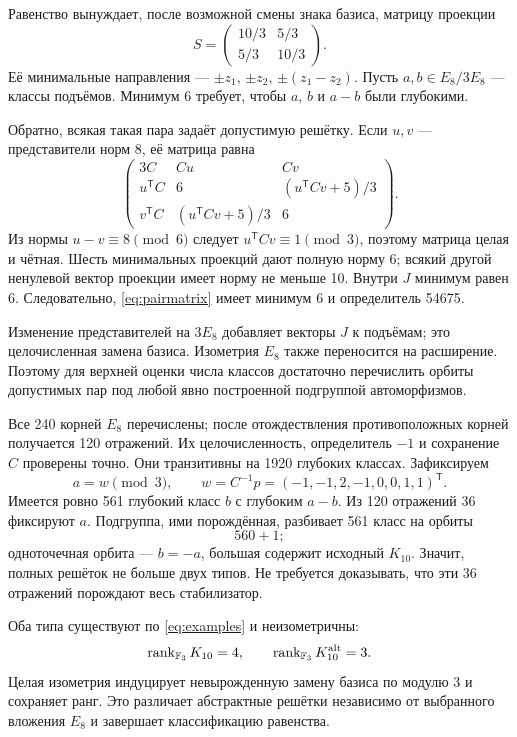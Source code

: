 \documentclass[11pt,a4paper]{article}
\theoremstyle{remark}\newtheorem{remark}[theorem]{Замечание}
\newcommand{\Kalt}{K_{10}^{\mathrm{alt}}}
\begin{document}
Равенство вынуждает, после возможной смены знака базиса, матрицу проекции
\begin{equation}\label{eq:binaryprojection}
S=\begin{pmatrix}10/3&5/3\\5/3&10/3\end{pmatrix}.
\end{equation}
Её минимальные направления --- $\pm z_1$, $\pm z_2$, $\pm(z_1-z_2)$. Пусть $a,b\in E_8/3E_8$ --- классы подъёмов. Минимум 6 требует, чтобы $a$, $b$ и $a-b$ были глубокими.

Обратно, всякая такая пара задаёт допустимую решётку. Если $u,v$ --- представители норм 8, её матрица равна
\begin{equation}\label{eq:pairmatrix}
\begin{pmatrix}
3C&Cu&Cv\\
u^{\mathsf T}C&6&(u^{\mathsf T}Cv+5)/3\\
v^{\mathsf T}C&(u^{\mathsf T}Cv+5)/3&6
\end{pmatrix}.
\end{equation}
Из нормы $u-v\equiv8\pmod6$ следует $u^{\mathsf T}Cv\equiv1\pmod3$, поэтому матрица целая и чётная. Шесть минимальных проекций дают полную норму 6; всякий другой ненулевой вектор проекции имеет норму не меньше 10. Внутри $J$ минимум равен 6. Следовательно, \eqref{eq:pairmatrix} имеет минимум 6 и определитель 54675.

Изменение представителей на $3E_8$ добавляет векторы $J$ к подъёмам; это целочисленная замена базиса. Изометрия $E_8$ также переносится на расширение. Поэтому для верхней оценки числа классов достаточно перечислить орбиты допустимых пар под любой явно построенной подгруппой автоморфизмов.

Все 240 корней $E_8$ перечислены; после отождествления противоположных корней получается 120 отражений. Их целочисленность, определитель $-1$ и сохранение $C$ проверены точно. Они транзитивны на 1920 глубоких классах. Зафиксируем
\[
a=w\pmod3,\qquad w=C^{-1}p=(-1,-1,2,-1,0,0,1,1)^{\mathsf T}.
\]
Имеется ровно 561 глубокий класс $b$ с глубоким $a-b$. Из 120 отражений 36 фиксируют $a$. Подгруппа, ими порождённая, разбивает 561 класс на орбиты
\[
560+1;
\]
одноточечная орбита --- $b=-a$, большая содержит исходный $K_{10}$. Значит, полных решёток не больше двух типов. Не требуется доказывать, что эти 36 отражений порождают весь стабилизатор.

Оба типа существуют по \eqref{eq:examples} и неизометричны:
\[
\rank_{\F_3}K_{10}=4,\qquad \rank_{\F_3}\Kalt=3.
\]
Целая изометрия индуцирует невырожденную замену базиса по модулю 3 и сохраняет ранг. Это различает абстрактные решётки независимо от выбранного вложения $E_8$ и завершает классификацию равенства.
\end{document}
